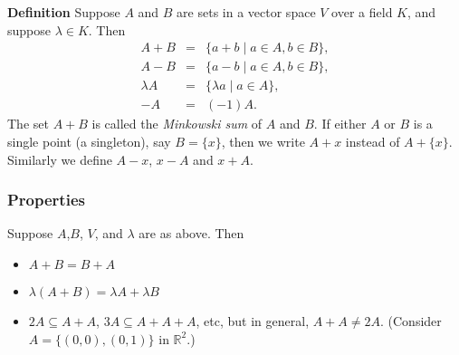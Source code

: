 \documentclass[12pt]{article}
\newcommand{\sR}[0]{\mathbb{R}}
\begin{document}
{\bf Definition}
Suppose $A$ and $B$ are sets in a vector space $V$ over a field $K$, 
and suppose $\lambda \in K$. Then
\begin{eqnarray*}
A+B&=&\{a+b \mid a\in A, b\in B\},\\
A-B&=&\{a-b \mid a\in A, b\in B\},\\
\lambda A&=& \{\lambda a \mid a\in A\},\\
-A &=& (-1) A.
\end{eqnarray*}
The set $A+B$ is called the \emph{Minkowski sum} of $A$ and $B$. 
If either $A$ or $B$ is a single point (a singleton), say $B=\{x\}$, then we 
write $A+x$ instead of $A+\{x\}$. Similarly we define $A-x$, $x-A$ and $x+A$.

\subsubsection*{Properties}
Suppose $A$,$B$, $V$, and $\lambda$ are as above. Then 
\begin{itemize}
\item $A+B=B+A$
\item $\lambda(A+B)=\lambda A+\lambda B$
\item $2A\subseteq A+A$, $3A\subseteq A+A+A$, etc, 
but in general, $A+A\neq 2A$. 
(Consider $A=\{(0,0),(0,1)\}$ in $\sR^2$.)
\end{itemize}
\end{document}
